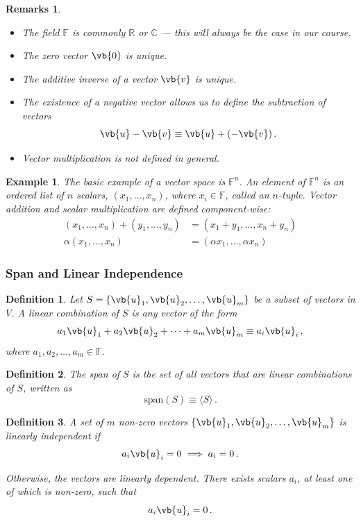 \documentclass{article}
\theoremstyle{plain}\theoremheaderfont{\normalfont\itshape}\theorembodyfont{\rmfamily}\theoremseparator{.}\newtheorem*{rem}{Remark}\newtheorem*{ex}{Example}\newtheorem*{proof}{Proof}\newtheorem*{altp}{Alternative proof}
\theoremstyle{plain}\theoremheaderfont{\normalfont\bfseries}\theorembodyfont{\rmfamily}\theoremseparator{.}\newtheorem{thm}{Theorem}[section]\newtheorem{lem}[thm]{Lemma}\newtheorem{prop}[thm]{Proposition}\newtheorem*{cor}{Corollary}\newtheorem{defn}[thm]{Definition}\newtheorem{clm}[thm]{Claim}\newtheorem{clminproof}{Claim}
\theoremstyle{break}\theoremheaderfont{\normalfont\itshape}\theorembodyfont{\rmfamily}\theoremseparator{.\medskip}\newtheorem*{proofskip}{Proof}\newtheorem*{exs}{Examples}\newtheorem*{rems}{Remarks}
\theoremstyle{break}\theoremheaderfont{\normalfont\bfseries}\theorembodyfont{\rmfamily}\theoremseparator{.\medskip}\newtheorem{lemskip}[thm]{Lemma}\newtheorem{defnskip}[thm]{Definition}\newtheorem{propskip}[thm]{Proposition}\newtheorem{thmskip}[thm]{Theorem}
\numberwithin{equation}{section}
\begin{document}
	\begin{rems}
		\begin{itemize}[topsep=0pt]
			\item The field \(\mathbb{F}\) is commonly \(\mathbb{R}\) or \(\mathbb{C}\) --- this will always be the case in our course.
			\item The zero vector \(\vb{0}\) is unique.
			\item The additive inverse of a vector \(\vb{v}\) is unique.
			\item The existence of a negative vector allows us to define the subtraction of vectors
			\[\vb{u}-\vb{v}\equiv\vb{u}+(-\vb{v})\,.\]
			\item Vector multiplication is not defined in general.
		\end{itemize}
	\end{rems}
	
	\begin{ex}
		The basic example of a vector space is \(\mathbb{F}^n\). An element of \(\mathbb{F}^n\) is an ordered list of \(n\) scalars, \((x_1,\dots,x_n)\), where \(x_i\in \mathbb{F}\), called an \(n\)-tuple. Vector addition and scalar multiplication are defined component-wise:
		\begin{align*}
			(x_1,\dots,x_n)+(y_1,\dots,y_n)&=(x_1+y_1,\dots,x_n+y_n)\\
			\alpha(x_1,\dots,x_n)&=(\alpha x_1,\dots,\alpha x_n)
		\end{align*}
	\end{ex}
	
	\subsubsection{Span and Linear Independence}
	\begin{defn}
		Let \(S=\{\vb{u}_1,\vb{u}_2,\dots,\vb{u}_m\}\) be a subset of vectors in \(V\). A \textit{linear combination} of \(S\) is any vector of the form
		\[a_1\vb{u}_1+a_2\vb{u}_2+\dots+a_m\vb{u}_m\equiv a_i\vb{u}_i\,,\]
		where \(a_1,a_2,\dots,a_m\in\mathbb{F}\).
	\end{defn}
	\begin{defn}
		The \textit{span} of \(S\) is the set of all vectors that are linear combinations of \(S\), written as
		\[\mathrm{span}(S)\equiv\langle S\rangle\,.\]
	\end{defn}
	\begin{defn}
		A set of \(m\) non-zero vectors \(\{\vb{u}_1,\vb{u}_2,\dots,\vb{u}_m\}\) is \textit{linearly independent} if
		\[a_i\vb{u}_i=0\implies a_i=0\,.\]
		
		Otherwise, the vectors are \textit{linearly dependent}. There exists scalars \(a_i\), at least one of which is non-zero, such that
		\[a_i\vb{u}_i=0\,.\]
	\end{defn}
	
\end{document}
